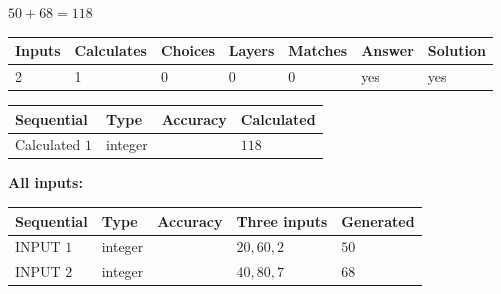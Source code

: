 \documentclass[12pt]{article}
\begin{document}
 
 
 
\noindent{}
 
 

$ %
50 +  %
68=   %
118$
 
 
\noindent{}
 
 

 
   
   
   
   
\noindent\begin{tabular}{|l|l|l|l|l|l|l|}
 \hline
Inputs & Calculates & Choices & Layers & Matches & Answer & Solution \\ \hline
 2  & 
 1  & 
 0
  & 
 0  & 
 0  & 
  yes & 
  yes 
  \\ \hline
 \end{tabular}
   
   
   
   
\noindent{}
   
   
  
  
\noindent\begin{tabular}{|l|l|l|l|}
\hline
 Sequential & Type & Accuracy & Calculated \\ 
\hline
 
 
  Calculated $  1 $ & integer &  & 
  $ 118 $ 
 \\  \hline  
 \end{tabular}
   
   
   
   
\noindent\vspace{0.1in}\hspace{-0.08in} {\textbf{\Large{All inputs: }}}
   
   
  
  
\noindent\begin{tabular}{|l|l|l|l|l|}
\hline
 Sequential & Type & Accuracy & Three inputs & Generated \\ 
\hline
 
 
  INPUT $  1 $ & integer &  & $
 20
 , 
 60
 , 
 2
 $ & $ 50 $ 
 \\  \hline  
 
 
  INPUT $  2 $ & integer &  & $
 40
 , 
 80
 , 
 7
 $ & $ 68 $ 
 \\  \hline  
 \end{tabular}
   
\end{document}
